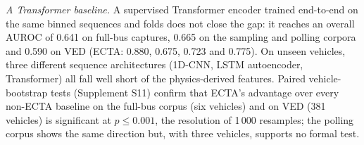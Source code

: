 
\emph{A Transformer baseline.} A supervised Transformer encoder trained
end-to-end on the same binned sequences and folds does not close the gap:
it reaches an overall AUROC of 0.641 on full-bus captures, 0.665 on the
sampling and polling corpora and 0.590 on VED (ECTA: 0.880, 0.675, 0.723
and 0.775). On unseen vehicles, three different sequence architectures
(1D-CNN, LSTM autoencoder, Transformer) all fall well short of the
physics-derived features. Paired vehicle-bootstrap tests (Supplement S11)
confirm that ECTA's advantage over every non-ECTA baseline on the full-bus
corpus (six vehicles) and on VED (381 vehicles) is significant at
$p\le 0.001$, the resolution of 1\,000 resamples; the polling corpus shows
the same direction but, with three vehicles, supports no formal test.
